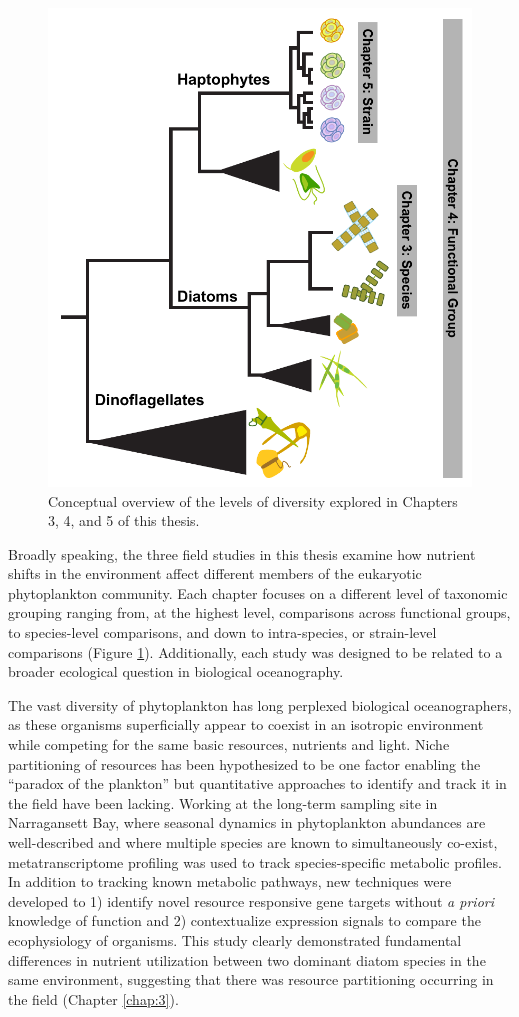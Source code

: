 \begin{figure}[t!]
  \centering
    \includegraphics[width=.75\textwidth]{Images/C1_ThesisDiagram.pdf}
    \caption{Conceptual overview of the levels of diversity explored in Chapters 3, 4, and 5 of this thesis.}
  \label{fig:c1f1}
\end{figure}

Broadly speaking, the three field studies in this thesis examine how nutrient shifts in the environment affect different members of the eukaryotic phytoplankton community. Each chapter focuses on a different level of taxonomic grouping ranging from, at the highest level, comparisons across functional groups, to species-level comparisons, and down to intra-species, or strain-level comparisons (Figure \ref{fig:c1f1}). Additionally, each study was designed to be related to a broader ecological question in biological oceanography. \par 

The vast diversity of phytoplankton has long perplexed biological oceanographers, as these organisms superficially appear to coexist in an isotropic environment while competing for the same basic resources, nutrients and light. Niche partitioning of resources has been hypothesized to be one factor enabling the ``paradox of the plankton'' \citep{Hutchinson1961} but quantitative approaches to identify and track it in the field have been lacking. Working at the long-term sampling site in Narragansett Bay, where seasonal dynamics in phytoplankton abundances are well-described and where multiple species are known to simultaneously co-exist, metatranscriptome profiling was used to track species-specific metabolic profiles. In addition to tracking known metabolic pathways, new techniques were developed to 1) identify novel resource responsive gene targets without \textit{a priori} knowledge of function and 2) contextualize expression signals to compare the ecophysiology of organisms. This study clearly demonstrated fundamental differences in nutrient utilization between two dominant diatom species in the same environment, suggesting that there was resource partitioning occurring in the field (Chapter \ref{chap:3}).\par 

